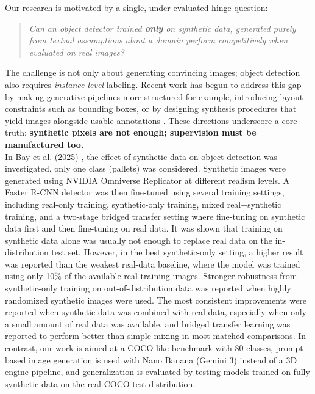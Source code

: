 \documentclass[conference]{IEEEtran}
\begin{document}
Our research is motivated by a single, under-evaluated hinge question:
\begin{quote}
\emph{Can an object detector trained \textbf{only} on synthetic data, generated purely from textual assumptions about a domain perform competitively when evaluated on real images?}
\end{quote}

The challenge is not only about generating convincing images; object detection also requires \emph{instance-level} labeling. Recent work has begun to address this gap by making generative pipelines more structured for example, introducing layout constraints such as bounding boxes, or by designing synthesis procedures that yield images alongside usable annotations \citep{li2023gligen,feng2024instagen}. These directions underscore a core truth: \textbf{synthetic pixels are not enough; supervision must be manufactured too.}\\

In Bay et al. (2025) \cite{bay2025impactsyntheticdataobject}, the effect of synthetic data on object detection was investigated, only one class (pallets) was considered. Synthetic images were generated using NVIDIA Omniverse Replicator at different realism levels. A Faster R-CNN detector was then fine-tuned using several training settings, including real-only training, synthetic-only training, mixed real+synthetic training, and a two-stage bridged transfer setting where fine-tuning on synthetic data first and then fine-tuning on real data. It was shown that training on synthetic data alone was usually not enough to replace real data on the in-distribution test set. However, in the best synthetic-only setting, a higher result was reported than the weakest real-data baseline, where the model was trained using only 10\% of the available real training images. Stronger robustness from synthetic-only training on out-of-distribution data was reported when highly randomized synthetic images were used. The most consistent improvements were reported when synthetic data was combined with real data, especially when only a small amount of real data was available, and bridged transfer learning was reported to perform better than simple mixing in most matched comparisons. In contrast, our work is aimed at a COCO-like benchmark with 80 classes, prompt-based image generation is used with Nano Banana (Gemini 3) instead of a 3D engine pipeline, and generalization is evaluated by testing models trained on fully synthetic data on the real COCO test distribution.\\
\end{document}
